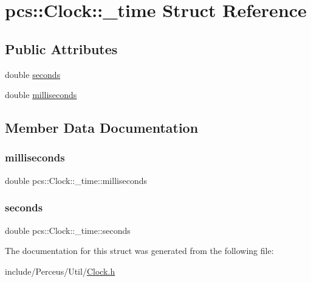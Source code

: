 \hypertarget{structpcs_1_1Clock_1_1__time}{}\section{pcs\+:\+:Clock\+:\+:\+\_\+time Struct Reference}
\label{structpcs_1_1Clock_1_1__time}
\subsection*{Public Attributes}
\begin{DoxyCompactItemize}
\item 
double \hyperlink{structpcs_1_1Clock_1_1__time_a6d0a904c6a28a74f9fd467a896df19a5}{seconds}
\item 
double \hyperlink{structpcs_1_1Clock_1_1__time_a84f935fd90a066f6b6d56da504dbe23d}{milliseconds}
\end{DoxyCompactItemize}


\subsection{Member Data Documentation}
\mbox{\label{structpcs_1_1Clock_1_1__time_a84f935fd90a066f6b6d56da504dbe23d}} 
\subsubsection{\texorpdfstring{milliseconds}{milliseconds}}
{\footnotesize\ttfamily double pcs\+::\+Clock\+::\+\_\+time\+::milliseconds}

\mbox{\label{structpcs_1_1Clock_1_1__time_a6d0a904c6a28a74f9fd467a896df19a5}} 
\subsubsection{\texorpdfstring{seconds}{seconds}}
{\footnotesize\ttfamily double pcs\+::\+Clock\+::\+\_\+time\+::seconds}



The documentation for this struct was generated from the following file\+:\begin{DoxyCompactItemize}
\item 
include/\+Perceus/\+Util/\hyperlink{Clock_8h}{Clock.\+h}\end{DoxyCompactItemize}
